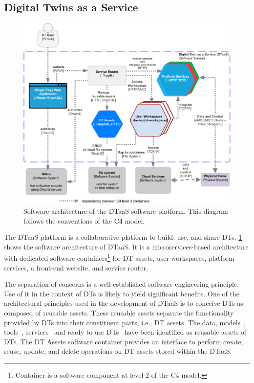 \subsection{Digital Twins as a Service}
\begin{figure}[t]
    \centering
    \includegraphics[width=\columnwidth]{images/DTaaS-architecture.pdf}
    \caption{Software architecture of the DTaaS software platform. This diagram follows the conventions of the C4 model.}
    \label{fig:dtaas-architecture}
\end{figure}%


The DTaaS platform is a collaborative platform to build, use, and share DTs. \cref{fig:dtaas-architecture} shows the software architecture of DTaaS. It is a microservices-based architecture with dedicated software containers\footnote{Container is a software component at level-2 of the C4 model.} for DT assets, user workspaces, platform services, a front-end website, and service router.

The separation of concerns is a well-established software engineering principle.
Use of it in the context of DTs is likely to yield significant benefits. One of the architectural principles used in the development of DTaaS is to conceive DTs as composed of reusable assets. These reusable assets separate the functionality provided by DTs into their constituent parts, i.e., DT assets.
The data, models~\cite{Zambrano&22}, tools~\cite{qi2021enabling}, services~\cite{budiardjo2021digital,robles2023opentwins} and ready to use DTs~\cite{aziz2023distributed} have been identified as reusable assets of DTs.
The DT Assets software container provides an interface to perform create, reuse, update, and delete operations on DT assets stored within the DTaaS.

